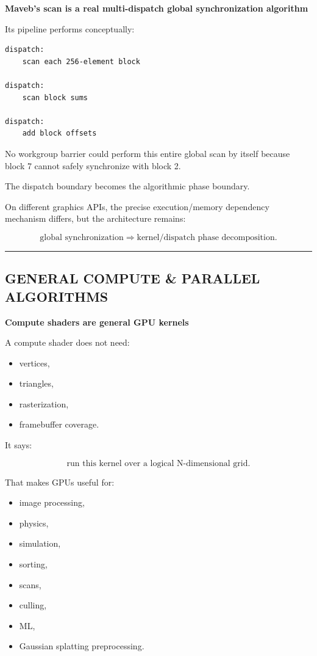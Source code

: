\textbf{Maveb's scan is a real multi-dispatch global synchronization algorithm}

Its pipeline performs conceptually:

\protect{}\label{0mnqgj}%
\begin{verbatim}
dispatch:
    scan each 256-element block

dispatch:
    scan block sums

dispatch:
    add block offsets
\end{verbatim}

No workgroup barrier could perform this entire global scan by itself because block 7 cannot safely synchronize with block 2.

The dispatch boundary becomes the algorithmic phase boundary.

On different graphics APIs, the precise execution/memory dependency mechanism differs, but the architecture remains:

\[
\boxed{
\text{global synchronization}
\Rightarrow
\text{kernel/dispatch phase decomposition}.
}
\]

\begin{center}\rule{0.5\linewidth}{0.5pt}\end{center}

\subsection{GENERAL COMPUTE \& PARALLEL ALGORITHMS}\label{03-visual-computing-i-ch016-general-compute-parallel-algorithms}

\hypertarget{03-visual-computing-i-ch016-general-compute-parallel-algorithms}{}

\textbf{Compute shaders are general GPU kernels}

A compute shader does not need:

\begin{itemize}
\tightlist
\item
  vertices,
\item
  triangles,
\item
  rasterization,
\item
  framebuffer coverage.
\end{itemize}

It says:

\[
\boxed{
\text{run this kernel over a logical N-dimensional grid}.
}
\]

That makes GPUs useful for:

\begin{itemize}
\tightlist
\item
  image processing,
\item
  physics,
\item
  simulation,
\item
  sorting,
\item
  scans,
\item
  culling,
\item
  ML,
\item
  Gaussian splatting preprocessing.
\end{itemize}

